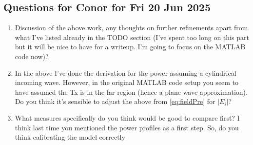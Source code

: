 \documentclass{article}
\begin{document}
\subsection{Questions for Conor for Fri 20 Jun 2025}
\begin{enumerate}
   \item Discussion of the above work, any thoughts on further refinements apart from
      what I've listed already in the TODO section (I've spent too long on this part
      but it will be nice to have for a writeup. I'm going to focus on the MATLAB
      code now)?
   \item In the above I've done the derivation for the power assuming a cylindrical
      incoming wave. However, in the original MATLAB code setup you seem to have
      assumed the Tx is in the far-region (hence a plane wave approximation). Do you
      think it's sensible to adjust the above from \eqref{eq:fieldPre} for $|E_i|$?
   \item What measures specifically do you think would be good to compare first? I
      think last time you mentioned the power profiles as a first step. So, do you
      think calibrating the model correctly 
\end{enumerate}
\end{document}
